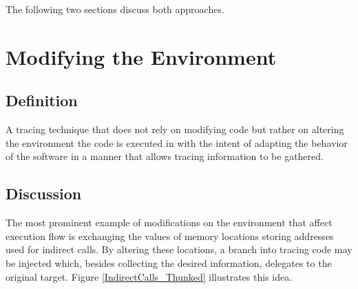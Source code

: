 The following two sections discuss both approaches.


\section{Modifying the Environment}
\label{sec:EnvMod}
\subsection*{Definition}
A tracing technique that does not rely on modifying code but rather on altering
the environment the code is executed in with the intent 
of adapting the behavior of the software in
a manner that allows tracing information to be gathered.


\subsection*{Discussion}
The most prominent example of modifications on the environment that affect execution flow is 
exchanging the values of memory locations storing addresses used for indirect calls. 
By altering these locations, a branch into tracing code may be injected which,
besides collecting the desired information, delegates to the original target. Figure
\ref{IndirectCalls_Thunked} illustrates this idea.

